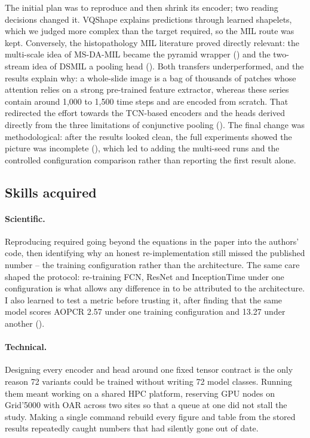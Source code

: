 The initial plan was to reproduce \millet{} and then shrink its encoder; two reading decisions
changed it. VQShape \citep{wen2024vqshape} explains predictions through learned shapelets, which we
judged more complex than the target required, so the MIL route was kept. Conversely, the
histopathology MIL literature proved directly relevant: the multi-scale idea of MS-DA-MIL
\citep{hashimoto2020msdamil} became the pyramid wrapper () and the two-stream
idea of DSMIL \citep{li2021dsmil} a pooling head (). Both transfers
underperformed, and the results explain why: a whole-slide image is a bag of thousands of patches
whose attention relies on a strong pre-trained feature extractor, whereas these series contain around
1{,}000 to 1{,}500 time steps and are encoded from scratch. That redirected the effort towards the
TCN-based encoders and the heads derived directly from the three limitations of conjunctive pooling
(). The final change was
methodological: after the \webtraffic{} results looked clean, the full \ucr{} experiments showed the
picture was incomplete (), which led to adding the multi-seed runs and the
controlled configuration comparison rather than reporting the first result alone.

\subsection{Skills acquired}
\label{app:skills}

\paragraph{Scientific.}
Reproducing \millet{} required going beyond the equations in the paper into the authors' code, then
identifying why an honest re-implementation still missed the published number -- the training
configuration rather than the architecture. The same care shaped the protocol: re-training FCN,
ResNet and InceptionTime under one configuration is what allows any difference in 
to be attributed to the architecture. I also learned to test a metric before trusting it, after
finding that the same model scores AOPCR 2.57 under one training configuration and 13.27 under
another ().

\paragraph{Technical.}
Designing every encoder and head around one fixed tensor contract is the only reason 72 variants
could be trained without writing 72 model classes. Running them meant working on a shared HPC
platform, reserving GPU nodes on Grid'5000 with OAR across two sites so that a queue at one did not
stall the study. Making a single command rebuild every figure and table from the stored results
repeatedly caught numbers that had silently gone out of date.

